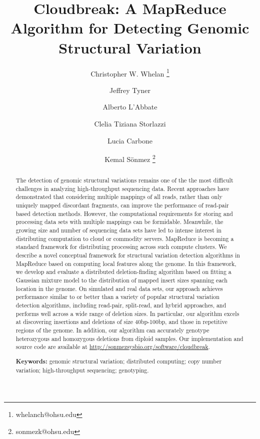 \documentclass[11pt]{article}
\begin{document}
\title{Cloudbreak: A MapReduce Algorithm for Detecting Genomic Structural Variation}

\author[1,5]{Christopher W. Whelan \thanks{whelanch@ohsu.edu}}
\author[3,4]{Jeffrey Tyner}
\author[6]{Alberto L'Abbate}
\author[6]{Clelia Tiziana Storlazzi}
\author[4,5]{Lucia Carbone}
\author[1,2,5]{Kemal S\"onmez \thanks{sonmezk@ohsu.edu}}

\maketitle

\begin{abstract}
The detection of genomic structural variations remains one of the the most difficult challenges in analyzing high-throughput sequencing data. Recent approaches have demonstrated that considering multiple mappings of all reads, rather than only uniquely mapped discordant fragments, can improve the performance of read-pair based detection methods. However, the computational requirements for storing and processing data sets with multiple mappings can be formidable. Meanwhile, the growing size and number of sequencing data sets have led to intense interest in distributing computation to cloud or commodity servers. MapReduce is becoming a standard framework for distributing processing across such compute clusters. We describe a novel conceptual framework for structural variation detection algorithms in MapReduce based on computing local features along the genome. In this framework, we develop and evaluate a distributed deletion-finding algorithm based on fitting a Gaussian mixture model to the distribution of mapped insert sizes spanning each location in the genome. On simulated and real data sets, our approach achieves performance similar to or better than a variety of popular structural variation detection algorithms, including read-pair, split-read, and hybrid approaches, and performs well across a wide range of deletion sizes. In particular, our algorithm excels at discovering insertions and deletions of size 40bp-100bp, and those in repetitive regions of the genome. In addition, our algorithm can accurately genotype heterozygous and homozygous deletions from diploid samples. Our implementation and source code are available at \url{http://sonmezsysbio.org/software/cloudbreak}.

\medskip
\noindent\textbf{Keywords:} genomic structural variation; distributed computing; copy number variation; high-throughput sequencing; genotyping.
\end{abstract}
\end{document}
